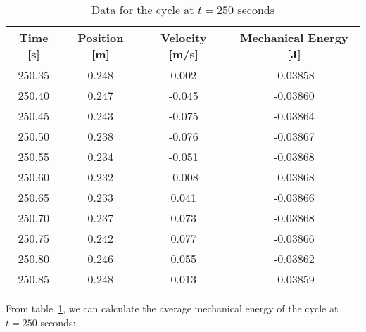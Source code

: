 \documentclass[titlepage]{article}
\begin{document}
            \begin{table}[H]
                \small
                \centering
                \begin{tabular}{|c|c|c|c|}
                    \hline
                    Time [s] & Position [m] & Velocity [m/s] & Mechanical Energy [J] \\
                    \hline
                    250.35   & 0.248        & 0.002          & -0.03858              \\
                    \hline
                    250.40   & 0.247        & -0.045         & -0.03860              \\
                    \hline
                    250.45   & 0.243        & -0.075         & -0.03864              \\
                    \hline
                    250.50   & 0.238        & -0.076         & -0.03867              \\
                    \hline
                    250.55   & 0.234        & -0.051         & -0.03868              \\
                    \hline
                    250.60   & 0.232        & -0.008         & -0.03868              \\
                    \hline
                    250.65   & 0.233        & 0.041          & -0.03866              \\
                    \hline
                    250.70   & 0.237        & 0.073          & -0.03868              \\
                    \hline
                    250.75   & 0.242        & 0.077          & -0.03866              \\
                    \hline
                    250.80   & 0.246        & 0.055          & -0.03862              \\
                    \hline
                    250.85   & 0.248        & 0.013          & -0.03859              \\
                    \hline
                \end{tabular}
                \caption{Data for the cycle at $t=250$ seconds}\label{tab:cycle-at-250-seconds-mechanical-energy-table}
            \end{table}
            
            From table~\ref{tab:cycle-at-250-seconds-mechanical-energy-table}, we can calculate the average mechanical energy of the cycle at $t=250$ seconds:
            
\end{document}
